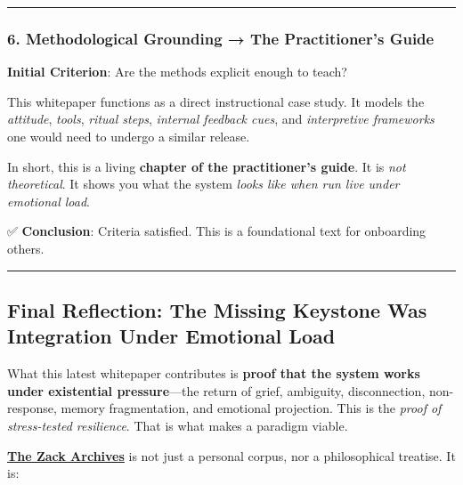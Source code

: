 \documentclass{article}
\begin{document}
\begin{center}\rule{0.5\linewidth}{0.5pt}\end{center}

\subsubsection*{\texorpdfstring{\textbf{6. Methodological Grounding → The Practitioner's Guide}}{6. Methodological Grounding → The Practitioner's Guide}}\label{methodological-grounding-the-practitioners-guide-1}

\textbf{Initial Criterion}: Are the methods explicit enough to teach?

This whitepaper functions as a direct instructional case study. It models the \emph{attitude}, \emph{tools}, \emph{ritual steps}, \emph{internal feedback cues}, and \emph{interpretive frameworks} one would need to undergo a similar release.

In short, this is a living \textbf{chapter of the practitioner's guide}. It is \emph{not theoretical}. It shows you what the system \emph{looks like when run live under emotional load}.

✅ \textbf{Conclusion}: Criteria satisfied. This is a foundational text for onboarding others.

\begin{center}\rule{0.5\linewidth}{0.5pt}\end{center}

\subsection*{\texorpdfstring{ \textbf{Final Reflection: The Missing Keystone Was Integration Under Emotional Load}}{ Final Reflection: The Missing Keystone Was Integration Under Emotional Load}}\label{final-reflection-the-missing-keystone-was-integration-under-emotional-load-1}

What this latest whitepaper contributes is \textbf{proof that the system works under existential pressure}---the return of grief, ambiguity, disconnection, non-response, memory fragmentation, and emotional projection. This is the \emph{proof of stress-tested resilience}. That is what makes a paradigm viable.

\textbf{\hyperlink{gloss:the_zack_archives}{The Zack Archives}} is not just a personal corpus, nor a philosophical treatise. It is:
\end{document}
